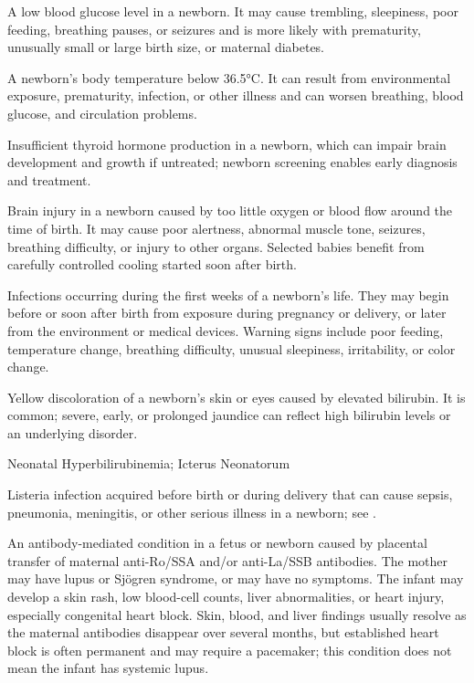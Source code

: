  A low blood glucose level in a newborn. It may cause trembling, sleepiness, poor feeding, breathing pauses, or seizures and is more likely with prematurity, unusually small or large birth size, or maternal diabetes.

 A newborn's body temperature below 36.5°C. It can result from environmental exposure, prematurity, infection, or other illness and can worsen breathing, blood glucose, and circulation problems.

 Insufficient thyroid hormone production in a newborn, which can impair brain development and growth if untreated; newborn screening enables early diagnosis and treatment.

 Brain injury in a newborn caused by too little oxygen or blood flow around the time of birth. It may cause poor alertness, abnormal muscle tone, seizures, breathing difficulty, or injury to other organs. Selected babies benefit from carefully controlled cooling started soon after birth.

 Infections occurring during the first weeks of a newborn’s life. They may begin before or soon after birth from exposure during pregnancy or delivery, or later from the environment or medical devices. Warning signs include poor feeding, temperature change, breathing difficulty, unusual sleepiness, irritability, or color change.

 Yellow discoloration of a newborn's skin or eyes caused by elevated bilirubin. It is common; severe, early, or prolonged jaundice can reflect high bilirubin levels or an underlying disorder.

\synonyms
Neonatal Hyperbilirubinemia; Icterus Neonatorum

 Listeria infection acquired before birth or during delivery that can cause sepsis, pneumonia, meningitis, or other serious illness in a newborn; see .

 An antibody-mediated condition in a fetus or newborn caused by placental transfer of maternal anti-Ro/SSA and/or anti-La/SSB antibodies. The mother may have lupus or Sjögren syndrome, or may have no symptoms. The infant may develop a skin rash, low blood-cell counts, liver abnormalities, or heart injury, especially congenital heart block. Skin, blood, and liver findings usually resolve as the maternal antibodies disappear over several months, but established heart block is often permanent and may require a pacemaker; this condition does not mean the infant has systemic lupus.

